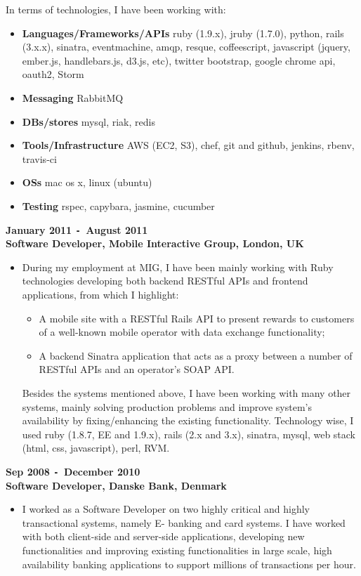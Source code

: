 \documentclass{res}
\def\Minus{\texttt{-}}
\begin{document}
\begin{resume}
\begin{itemize}
      In terms of technologies, I have been working with:
      \begin{itemize}
        \item[] {\bf Languages/Frameworks/APIs} ruby (1.9.x), jruby (1.7.0), python, rails (3.x.x), sinatra, eventmachine, amqp, resque, coffeescript, javascript (jquery, ember.js, handlebars.js, d3.js, etc), twitter bootstrap, google chrome api, oauth2, Storm
        \item[] {\bf Messaging} RabbitMQ
        \item[] {\bf DBs/stores} mysql, riak, redis
        \item[] {\bf Tools/Infrastructure} AWS (EC2, S3), chef, git and github, jenkins, rbenv, travis-ci
        \item[] {\bf OSs} mac os x, linux (ubuntu)
        \item[] {\bf Testing} rspec, capybara, jasmine, cucumber
      \end{itemize}

      \end{itemize}
  {\bf January 2011 \Minus\, August 2011}\\
  {\bf Software Developer, Mobile Interactive Group, London, UK}
       \begin{itemize}
        \item[] During my employment at MIG, I have been mainly working with Ruby technologies developing both backend RESTful APIs and frontend applications, from which I highlight:
          \begin{itemize}
          \item A mobile site with a RESTful Rails API to present rewards to customers of a well-known mobile operator with data exchange functionality;
          \item A backend Sinatra application that acts as a proxy between a number of RESTful APIs and an operator’s SOAP API.
          \end{itemize}

        Besides the systems mentioned above, I have been working with many other systems, mainly solving production problems and improve system’s availability by fixing/enhancing the existing functionality. Technology wise, I used ruby (1.8.7, EE and 1.9.x), rails (2.x and 3.x), sinatra, mysql, web stack (html, css, javascript), perl, RVM.
    \end{itemize}

  {\bf Sep 2008 \Minus\, December 2010}\\
  {\bf Software Developer, Danske Bank, Denmark}
        \begin{itemize}
        \item[] I worked as a Software Developer on two highly critical and highly transactional systems, namely E- banking and card systems. I have worked with both client-side and server-side applications, developing new functionalities and improving existing functionalities in large scale, high availability banking applications to support millions of transactions per hour.


\end{itemize}
\end{resume}
\end{document}
